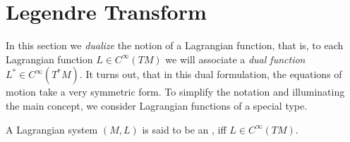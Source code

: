 \section*{Legendre Transform}
In this section we \emph{dualize} the notion of a Lagrangian function, that is, to each Lagrangian function $L \in C^\infty(TM)$ we will associate a \emph{dual function} $L^* \in C^\infty(T^*M)$. It turns out, that in this dual formulation, the equations of motion take a very symmetric form. To simplify the notation and illuminating the main concept, we consider Lagrangian functions of a special type.

\begin{definition}
	A Lagrangian system $(M,L)$ is said to be an , iff $L \in C^\infty(TM)$.
\end{definition}

